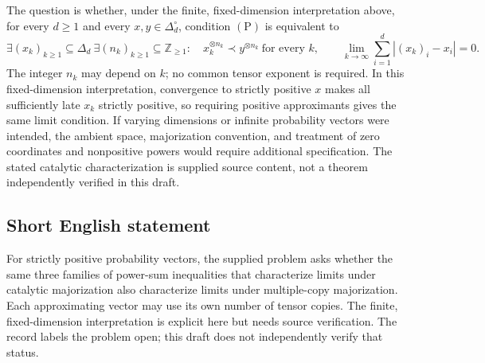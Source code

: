 \documentclass[11pt]{article}
\newcommand{\Z}{\mathbb{Z}}
\begin{document}
The question is whether, under the finite, fixed-dimension interpretation above, for every \(d\geq1\) and every \(x,y\in\Delta_d^{\circ}\), condition \(\mathrm{(P)}\) is equivalent to
\[
\exists (x_k)_{k\geq1}\subseteq\Delta_d\ \exists(n_k)_{k\geq1}\subseteq\Z_{\geq1}:\quad
x_k^{\otimes n_k}\prec y^{\otimes n_k}\ \text{for every }k,
\qquad
\lim_{k\to\infty}\sum_{i=1}^d |(x_k)_i-x_i|=0.
\]
The integer \(n_k\) may depend on \(k\); no common tensor exponent is required. In this fixed-dimension interpretation, convergence to strictly positive \(x\) makes all sufficiently late \(x_k\) strictly positive, so requiring positive approximants gives the same limit condition. If varying dimensions or infinite probability vectors were intended, the ambient space, majorization convention, and treatment of zero coordinates and nonpositive powers would require additional specification. The stated catalytic characterization is supplied source content, not a theorem independently verified in this draft.
\subsection{Short English statement}
For strictly positive probability vectors, the supplied problem asks whether the same three families of power-sum inequalities that characterize limits under catalytic majorization also characterize limits under multiple-copy majorization. Each approximating vector may use its own number of tensor copies. The finite, fixed-dimension interpretation is explicit here but needs source verification. The record labels the problem open; this draft does not independently verify that status.
\end{document}
